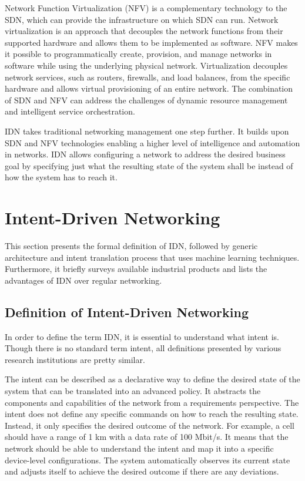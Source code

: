 Network Function Virtualization (NFV) is a complementary technology to the SDN, which can provide the infrastructure on which SDN can run. Network virtualization is an approach that decouples the network functions from their supported hardware and allows them to be implemented as software. NFV makes it possible to programmatically create, provision, and manage networks in software while using the underlying physical network. Virtualization decouples network services, such as routers, firewalls, and load balances, from the specific hardware and allows virtual provisioning of an entire network. The combination of SDN and NFV can address the challenges of dynamic resource management and intelligent service orchestration.\cite{Li2015}

IDN takes traditional networking management one step further. It builds upon SDN and NFV technologies enabling a higher level of intelligence and automation in networks. IDN allows configuring a network to address the desired business goal by specifying just what the resulting state of the system shall be instead of how the system has to reach it.


\section{Intent-Driven Networking}
\label{sec:Intent_Driven_Networking}
This section presents the formal definition of IDN, followed by generic architecture and intent translation process that uses machine learning techniques. Furthermore, it briefly surveys available industrial products and lists the advantages of IDN over regular networking.

\subsection{Definition of Intent-Driven Networking}
In order to define the term IDN, it is essential to understand what intent is. Though there is no standard term intent, all definitions presented by various research institutions are pretty similar.

The intent can be described as a declarative way to define the desired state of the system that can be translated into an advanced policy. It abstracts the components and capabilities of the network from a requirements perspective. The intent does not define any specific commands on how to reach the resulting state. Instead, it only specifies the desired outcome of the network. For example, a cell should have a range of 1 km with a data rate of 100 Mbit/s.\cite{Mwanje2021} It means that the network should be able to understand the intent and map it into a specific device-level configurations.  The system automatically observes its current state and adjusts itself to achieve the desired outcome if there are any deviations. \cite[22867]{8968429}

